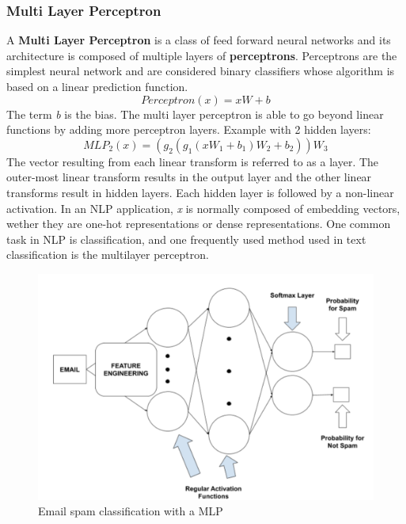 \documentclass{scrartcl}
\begin{document}
    \subsubsection{ Multi Layer Perceptron }
    A \textbf{Multi Layer Perceptron} is a class of feed forward neural networks and its
    architecture is composed of multiple layers of \textbf{perceptrons}. Perceptrons are
    the simplest neural network and are considered binary classifiers whose algorithm 
    is based on a linear prediction function. \newline
    \begin{equation}
        Perceptron(x) = xW + b
    \end{equation}
    The term \textit{b} is the bias.
    The multi layer perceptron is able to go beyond linear functions by adding more perceptron
    layers.
    Example with 2 hidden layers:
    \begin{equation}
        MLP_2(x) = (g_2(g_1(xW_1 + b_1)W_2 + b_2))W_3
    \end{equation}
    The vector resulting from each linear transform is referred to as a layer. 
    The outer-most linear transform results in the output layer and the other linear transforms 
    result in hidden layers. Each hidden layer is followed by a non-linear activation.
    \newpage
    In an NLP application, \textit{x} is normally composed of embedding vectors, wether they 
    are one-hot representations or dense representations.
    One common task in NLP is classification, and one frequently used method used in text
    classification is the multilayer perceptron.
    \begin{figure}[h!]
        \centering
        \includegraphics[scale=0.2]{mlp.png}
        \caption{Email spam classification with a MLP}
    \end{figure} \newline
\end{document}
